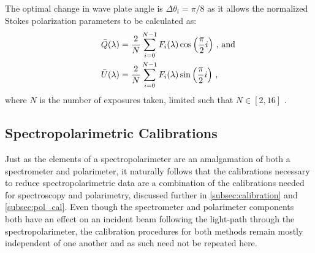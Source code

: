 The optimal change in wave plate angle is $\Delta\theta_{i} = \pi/8$ as it allows the normalized Stokes polarization parameters to be calculated as:
\begin{equation} \label{eq:specpol_Stokes_sol}
    \begin{aligned}
        \bar{Q}(\lambda) &= \frac{2}{N} \sum_{i = 0}^{N - 1} F_{i}(\lambda) \cos\left(\frac{\pi}{2} i\right) \rlap{\,,\ and}\\
        \bar{U}(\lambda) &= \frac{2}{N} \sum_{i = 0}^{N - 1} F_{i}(\lambda) \sin\left(\frac{\pi}{2} i\right)\,,
    \end{aligned}
\end{equation}
where $N$ is the number of exposures taken, limited such that $N \in [2, 16]$ \citep{polarimetry_error}.


\subsection{Spectropolarimetric Calibrations} \label{subsec:specpol_cal}

Just as the elements of a spectropolarimeter are an amalgamation of both a spectrometer and polarimeter, it naturally follows that the calibrations necessary to reduce spectropolarimetric data are a combination of the calibrations needed for spectroscopy and polarimetry, discussed further in \autoref{subsec:calibration} and \autoref{subsec:pol_cal}.
Even though the spectrometer and polarimeter components both have an effect on an incident beam following the light-path through the spectropolarimeter, the calibration procedures for both methods remain mostly independent of one another and as such need not be repeated here.

